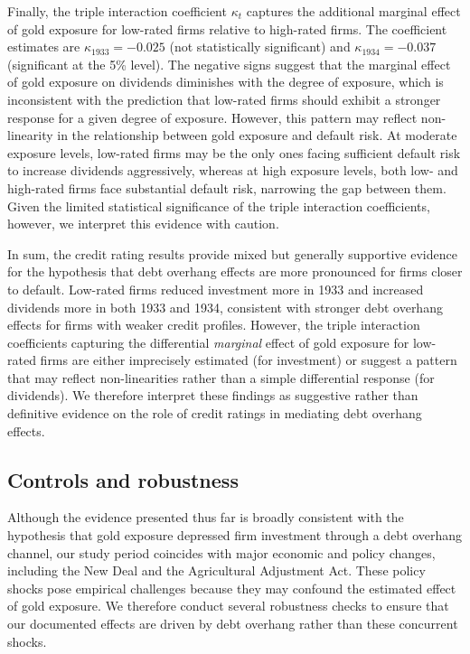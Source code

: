 Finally, the triple interaction coefficient $\kappa_t$ captures the additional marginal effect of gold exposure for low-rated firms relative to high-rated firms. The coefficient estimates are $\kappa_{1933} = -0.025$ (not statistically significant) and $\kappa_{1934} = -0.037$ (significant at the 5\% level). The negative signs suggest that the marginal effect of gold exposure on dividends diminishes with the degree of exposure, which is inconsistent with the prediction that low-rated firms should exhibit a stronger response for a given degree of exposure. However, this pattern may reflect non-linearity in the relationship between gold exposure and default risk. At moderate exposure levels, low-rated firms may be the only ones facing sufficient default risk to increase dividends aggressively, whereas at high exposure levels, both low- and high-rated firms face substantial default risk, narrowing the gap between them. Given the limited statistical significance of the triple interaction coefficients, however, we interpret this evidence with caution.

In sum, the credit rating results provide mixed but generally supportive evidence for the hypothesis that debt overhang effects are more pronounced for firms closer to default. Low-rated firms reduced investment more in 1933 and increased dividends more in both 1933 and 1934, consistent with stronger debt overhang effects for firms with weaker credit profiles. However, the triple interaction coefficients capturing the differential \textit{marginal} effect of gold exposure for low-rated firms are either imprecisely estimated (for investment) or suggest a pattern that may reflect non-linearities rather than a simple differential response (for dividends). We therefore interpret these findings as suggestive rather than definitive evidence on the role of credit ratings in mediating debt overhang effects. 

\subsection{Controls and robustness}
\label{sec:cont}
\noindent
Although the evidence presented thus far is broadly consistent with the hypothesis that gold exposure depressed firm investment through a debt overhang channel, our study period coincides with major economic and policy changes, including the New Deal and the Agricultural Adjustment Act. These policy shocks pose empirical challenges because they may confound the estimated effect of gold exposure. We therefore conduct several robustness checks to ensure that our documented effects are driven by debt overhang rather than these concurrent shocks.

